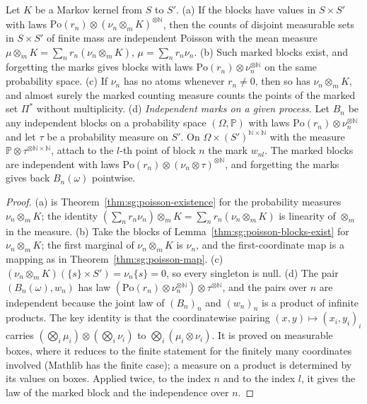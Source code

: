 \begin{theorem}\label{thm:sg:poisson-marking}
  \leanok
Let $K$ be a Markov kernel from $S$ to $S'$.
(a) If the blocks have values in $S\times S'$ with laws $\mathrm{Po}(r_n)\otimes(\nu_n\otimes_mK)^{\otimes\mathbb N}$, then the counts of disjoint measurable sets in $S\times S'$ of finite mass are independent Poisson with the mean measure $\mu\otimes_mK=\sum_nr_n(\nu_n\otimes_mK)$, $\mu=\sum_nr_n\nu_n$.
(b) Such marked blocks exist, and forgetting the marks gives blocks with laws $\mathrm{Po}(r_n)\otimes\nu_n^{\otimes\mathbb N}$ on the same probability space.
(c) If $\nu_n$ has no atoms whenever $r_n\ne0$, then so has $\nu_n\otimes_mK$, and almost surely the marked counting measure counts the points of the marked set $\Pi^*$ without multiplicity.
(d) \emph{Independent marks on a given process.} Let $B_n$ be any independent blocks on a probability space $(\Omega,\mathbb P)$ with laws $\mathrm{Po}(r_n)\otimes\nu_n^{\otimes\mathbb N}$ and let $\tau$ be a probability measure on $S'$. On $\Omega\times(S')^{\mathbb N\times\mathbb N}$ with the measure $\mathbb P\otimes\tau^{\otimes\mathbb N\times\mathbb N}$, attach to the $l$-th point of block $n$ the mark $w_{nl}$. The marked blocks are independent with laws $\mathrm{Po}(r_n)\otimes(\nu_n\otimes\tau)^{\otimes\mathbb N}$, and forgetting the marks gives back $B_n(\omega)$ pointwise.
\end{theorem}

\begin{proof}
  \leanok
{}
(a) is Theorem~\ref{thm:sg:poisson-existence} for the probability measures $\nu_n\otimes_mK$; the identity $(\sum_nr_n\nu_n)\otimes_mK=\sum_nr_n(\nu_n\otimes_mK)$ is linearity of $\otimes_m$ in the measure. (b) Take the blocks of Lemma~\ref{thm:sg:poisson-blocks-exist} for $\nu_n\otimes_mK$; the first marginal of $\nu_n\otimes_mK$ is $\nu_n$, and the first-coordinate map is a mapping as in Theorem~\ref{thm:sg:poisson-map}. (c) $(\nu_n\otimes_mK)(\{s\}\times S')=\nu_n\{s\}=0$, so every singleton is null. (d) The pair $(B_n(\omega),w_n)$ has law $(\mathrm{Po}(r_n)\otimes\nu_n^{\otimes\mathbb N})\otimes\tau^{\otimes\mathbb N}$, and the pairs over $n$ are independent because the joint law of $(B_n)_n$ and $(w_n)_n$ is a product of infinite products. The key identity is that the coordinatewise pairing $(x,y)\mapsto(x_i,y_i)_i$ carries $(\bigotimes_i\mu_i)\otimes(\bigotimes_i\nu_i)$ to $\bigotimes_i(\mu_i\otimes\nu_i)$. It is proved on measurable boxes, where it reduces to the finite statement for the finitely many coordinates involved (Mathlib has the finite case); a measure on a product is determined by its values on boxes. Applied twice, to the index $n$ and to the index $l$, it gives the law of the marked block and the independence over $n$.
\end{proof}

